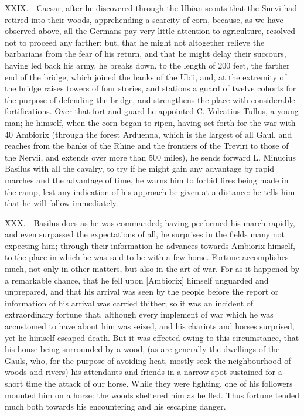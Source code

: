 XXIX.—Caesar, after he discovered through the Ubian scouts that the
Suevi had retired into their woods, apprehending a scarcity of corn,
because, as we have observed above, all the Germans pay very little
attention to agriculture, resolved not to proceed any farther; but, that
he might not altogether relieve the barbarians from the fear of his
return, and that he might delay their succours, having led back his
army, he breaks down, to the length of 200 feet, the farther end of the
bridge, which joined the banks of the Ubii, and, at the extremity of the
bridge raises towers of four stories, and stations a guard of twelve
cohorts for the purpose of defending the bridge, and strengthens the
place with considerable fortifications. Over that fort and guard he
appointed C. Volcatius Tullus, a young man; he himself, when the corn
began to ripen, having set forth for the war with 40 Ambiorix (through
the forest Arduenna, which is the largest of all Gaul, and reaches from
the banks of the Rhine and the frontiers of the Treviri to those of the
Nervii, and extends over more than 500 miles), he sends forward L.
Minucius Basilus with all the cavalry, to try if he might gain any
advantage by rapid marches and the advantage of time, he warns him to
forbid fires being made in the camp, lest any indication of his approach
be given at a distance: he tells him that he will follow immediately.

XXX.—Basilus does as he was commanded; having performed his march
rapidly, and even surpassed the expectations of all, he surprises in the
fields many not expecting him; through their information he advances
towards Ambiorix himself, to the place in which he was said to be with a
few horse. Fortune accomplishes much, not only in other matters, but
also in the art of war. For as it happened by a remarkable chance, that
he fell upon [Ambiorix] himself unguarded and unprepared, and that his
arrival was seen by the people before the report or information of his
arrival was carried thither; so it was an incident of extraordinary
fortune that, although every implement of war which he was accustomed to
have about him was seized, and his chariots and horses surprised, yet he
himself escaped death. But it was effected owing to this circumstance,
that his house being surrounded by a wood, (as are generally the
dwellings of the Gauls, who, for the purpose of avoiding heat, mostly
seek the neighbourhood of woods and rivers) his attendants and friends
in a narrow spot sustained for a short time the attack of our horse.
While they were fighting, one of his followers mounted him on a horse:
the woods sheltered him as he fled. Thus fortune tended much both
towards his encountering and his escaping danger.

